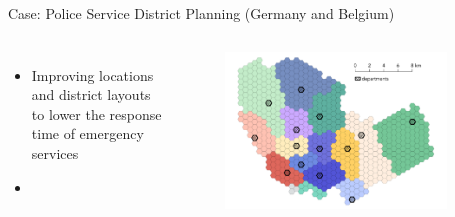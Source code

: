 \documentclass[aspectratio=1610,12pt]{beamer}
\begin{document}

\begin{frame}[fragile]{Case: Police Service District Planning (Germany and Belgium)}
	\begin{columns}[onlytextwidth]
		\center
			\begin{itemize}
				\item Improving locations and district layouts to lower the response time of emergency services
				\item {}
	    		\end{itemize}
    	\center
    		\begin{figure}
    			\includegraphics[width=0.9\textwidth]{images/G3_C3.pdf}
    		\end{figure}
    \end{columns}
\end{frame}
\end{document}
